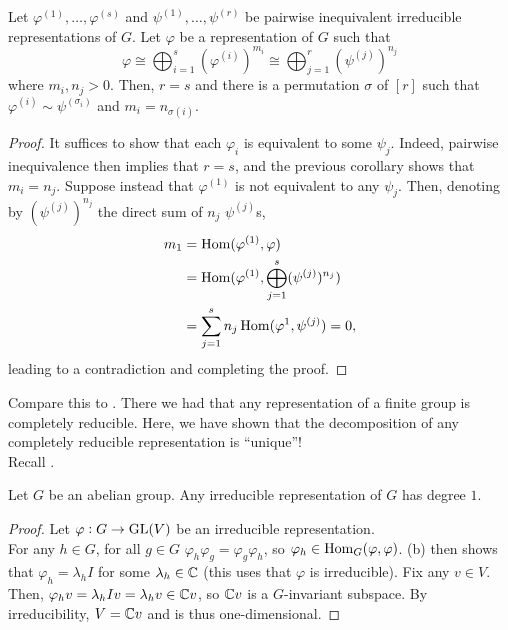 		\begin{fcor}
			\label{cor: completely reducible unique decomp}
			Let $\varphi^{(1)},\ldots,\varphi^{(s)}$ and $\psi^{(1)},\ldots,\psi^{(r)}$ be pairwise\footnotemark{} inequivalent irreducible representations of $G$. Let $\varphi$ be a representation of $G$ such that
			\[ \varphi \cong \bigoplus_{i=1}^{s} (\varphi^{(i)})^{m_i} \cong \bigoplus_{j=1}^r (\psi^{(j)})^{n_j} \]
			where $m_i,n_j > 0$.
			Then, $r=s$ and there is a permutation $\sigma$ of $[r]$ such that $\varphi^{(i)} \sim \psi^{(\sigma_i)}$ and $m_i = n_{\sigma(i)}$.
		\end{fcor}
		\begin{proof}
			It suffices to show that each $\varphi_i$ is equivalent to some $\psi_j$. Indeed, pairwise inequivalence then implies that $r=s$, and the previous corollary shows that $m_i = n_j$. Suppose instead that $\varphi^{(1)}$ is not equivalent to any $\psi_j$. Then, denoting by $(\psi^{(j)})^{n_j}$ the direct sum of $n_j$ $\psi^{(j)}$s,
			\begin{align*}
				m_1 &= \operatorname{Hom}(\varphi^{(1)}, \varphi) \\
					&= \operatorname{Hom}(\varphi^{(1)}, \bigoplus_{j=1}^s (\psi^{(j)})^{n_j}) \\
					&= \sum_{j=1}^s n_j \operatorname{Hom}(\varphi^{1},\psi^{(j)}) = 0,
			\end{align*}
			leading to a contradiction and completing the proof.
		\end{proof}

		Compare this to . There we had that any representation of a finite group is completely reducible. Here, we have shown that the decomposition of any completely reducible representation is ``unique''!\\

		Recall .

		\begin{ftheo}
			\label{theo: irreducible reps of finite abelian groups}
			Let $G$ be an abelian group. Any irreducible representation of $G$ has degree $1$.
		\end{ftheo}
		\begin{proof}
			Let $\varphi : G \to \operatorname{GL}(V)$ be an irreducible representation.\\
			For any $h \in G$, for all $g \in G$ $\varphi_h \varphi_g = \varphi_g \varphi_h$, so $\varphi_h \in \operatorname{Hom}_G(\varphi,\varphi)$. (b) then shows that $\varphi_h = \lambda_h I$ for some $\lambda_h \in \mathbb{C}$ (this uses that $\varphi$ is irreducible). Fix any $v \in V$. Then, $\varphi_h v = \lambda_h I v = \lambda_h v \in \mathbb{C} v$, so $\mathbb{C} v$ is a $G$-invariant subspace. By irreducibility, $V = \mathbb{C} v$ and is thus one-dimensional.
		\end{proof}


